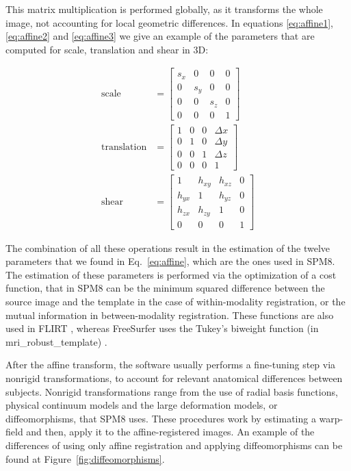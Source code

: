This matrix multiplication is performed globally, as it transforms the whole image, not accounting for local geometric differences. In equations \ref{eq:affine1}, \ref{eq:affine2} and \ref{eq:affine3} we give an example of the parameters that are computed for scale, translation and shear in 3D:

\begin{align}
\label{eq:affine1}
	\text{scale} &= 
	\left[\begin{matrix}
		 s_x  &0 & 0 & 0\\
		0 &s_y &0 &0\\
		0 &0 &s_z &0\\
		0 &0 &0 &1		
	\end{matrix}
	\right]\\
	\label{eq:affine2}
	\text{translation} &= 
	\left[
	\begin{matrix}
	1  &0 & 0 & \Delta x\\
	0 &1 &0 &\Delta y\\
	0 &0 &1 &\Delta z\\
	0 &0 &0 &1		
	\end{matrix}
	\right] \\
	\label{eq:affine3}
	\text{shear} &= 
	\left[\begin{matrix}
	1  &h_{xy}& h_{xz} & 0\\
	h_{yx} &1 &h_{yz} &0\\
	h_{zx} &h_{zy} &1 &0\\
	0 &0 &0 &1		
	\end{matrix}
	\right]
\end{align}

The combination of all these operations result in the estimation of the twelve parameters that we found in Eq.~\ref{eq:affine}, which are the ones used in \ac{SPM8}. The estimation of these parameters is performed via the optimization of a cost function, that in \ac{SPM8} can be the minimum squared difference between the source image and the template \cite{spm_book} in the case of within-modality registration, or the mutual information in between-modality registration. These functions are also used in FLIRT \cite{Jenkinson2001}, whereas FreeSurfer uses the Tukey's biweight function (in {\ttfamily mri\_robust\_template}) \cite{Reuter2012}.

After the affine transform, the software usually performs a fine-tuning step via nonrigid transformations, to account for relevant a\-na\-to\-mi\-cal differences between subjects. Nonrigid transformations range from the use of radial basis functions, physical continuum models and the large deformation models, or diffeomorphisms, that \ac{SPM8} uses. These procedures work by estimating a warp-field and then, apply it to the affine-registered images. An example of the differences of using only affine registration and applying diffeomorphisms can be found at Figure~\ref{fig:diffeomorphisms}.

